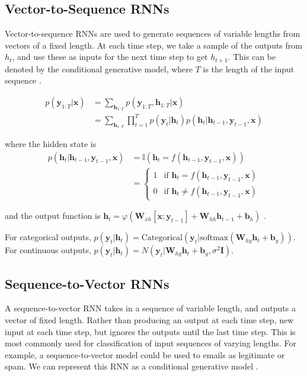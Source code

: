 \documentclass{article}
\begin{document}
\subsection{Vector-to-Sequence RNNs}

Vector-to-sequence RNNs are used to generate sequences of variable lengths from vectors of a fixed length. At each time step, we take a sample of the outputs from \(h_t\), and use these as inputs for the next time step to get \(h_{t+1}\). This can be denoted by the conditional generative model, where \(T\) is the length of the input sequence \cite{pml1book}.

\begin{align*}
    p(\bm{y}_{1:T}|\bm{x}) &= \sum_{\bm{h}_{1:T}}p(\bm{y}_{1:T},\bm{h}_{1:T}|\bm{x}) \\
    &= \sum_{\bm{h}_{1:T}} \prod_{t=1}^T p(\bm{y}_t|\bm{h}_t)p(\bm{h}_t|\bm{h}_{t-1},\bm{y}_{t-1},\bm{x})
\end{align*}

where the hidden state is 
\begin{align*}
    p(\bm{h}_t|\bm{h}_{t-1}, \bm{y}_{t-1}, \bm{x}) &= \mathbb{I}(\bm{h}_t = f(\bm{h}_{t-1}, \bm{y}_{t-1}, \bm{x}))\\
    & =
\begin{cases}
    1 & \text{if } \bm{h}_t = f(\bm{h}_{t-1}, \bm{y}_{t-1}, \bm{x}) \\
    0 & \text{if } \bm{h}_t \neq f(\bm{h}_{t-1}, \bm{y}_{t-1}, \bm{x})
\end{cases}
\end{align*}

and the output function is \(\bm{h}_t = \varphi(\bm{W}_{xh}[\bm{x};\bm{y}_{t-1}] + \bm{W}_{hh}\bm{h}_{t-1}+\bm{b}_h)\) \cite{pml1book}.

For categorical outputs, \(p(\bm{y}_t|\bm{h}_t)=\text{Categorical}(\bm{y}_t|\text{softmax}(\bm{W}_{hy}\bm{h}_t+\bm{b}_y))\). For continuous outputs, \(p(\bm{y}_t|\bm{h}_t)=\mathit{N}(\bm{y}_t|\bm{W}_{hy}\bm{h}_t+\bm{b}_y,\sigma^2\bm{I})\).

\subsection{Sequence-to-Vector RNNs}

A sequence-to-vector RNN takes in a sequence of variable length, and outputs a vector of fixed length. Rather than producing an output at each time step,  new input at each time step, but ignores the outputs until the last time step. This is most commonly used for classification of input sequences of varying lengths. For example, a sequence-to-vector model could be used to emails as legitimate or spam. We can represent this RNN as a conditional generative model \cite{pml1book}. 
\end{document}
